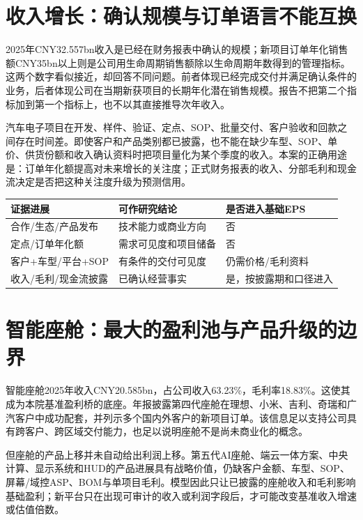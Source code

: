 \section{收入增长：确认规模与订单语言不能互换}

2025年CNY32.557bn收入是已经在财务报表中确认的规模；新项目订单年化销售额CNY35bn以上则是公司用生命周期销售额除以生命周期年数得到的管理指标。这两个数字看似接近，却回答不同问题。前者体现已经完成交付并满足确认条件的业务，后者体现公司在当期新获项目的长期年化潜在销售规模。报告不把第二个指标加到第一个指标上，也不以其直接推导次年收入。

汽车电子项目在开发、样件、验证、定点、SOP、批量交付、客户验收和回款之间存在时间差。即使客户和产品类别都已披露，也不能在缺少车型、SOP、单价、供货份额和收入确认资料时把项目量化为某个季度的收入。本案的正确用途是：订单年化额提高对未来增长的关注度；正式财务报表的收入、分部毛利和现金流决定是否把这种关注度升级为预测信用。

\begin{exhibitbox}
\small
\begin{tabularx}{\textwidth}{L{2.7cm}Y Y}
\toprule
证据进展 & 可作研究结论 & 是否进入基础EPS \\
\midrule
合作/生态/产品发布 & 技术能力或商业方向 & 否 \\
定点/订单年化额 & 需求可见度和项目储备 & 否 \\
客户+车型/平台+SOP & 有条件的交付可见度 & 仍需价格/毛利资料 \\
收入/毛利/现金流披露 & 已确认经营事实 & 是，按披露期和口径进入 \\
\bottomrule
\end{tabularx}
\end{exhibitbox}

\section{智能座舱：最大的盈利池与产品升级的边界}

智能座舱2025年收入CNY20.585bn，占公司收入63.23\%，毛利率18.83\%。这使其成为本院基准盈利桥的底座。年报披露第四代座舱在理想、小米、吉利、奇瑞和广汽客户中成功配套，并列示多个国内外客户的新项目订单。该信息足以支持公司具有跨客户、跨区域交付能力，也足以说明座舱不是尚未商业化的概念。

但座舱的产品上移并未自动给出利润上移。第五代AI座舱、端云一体方案、中央计算、显示系统和HUD的产品进展具有战略价值，仍缺客户金额、车型、SOP、屏幕/域控ASP、BOM与单项目毛利。模型因此只让已披露的座舱收入和毛利影响基础盈利；新平台只在出现可审计的收入或利润字段后，才可能改变基准收入增速或估值倍数。

